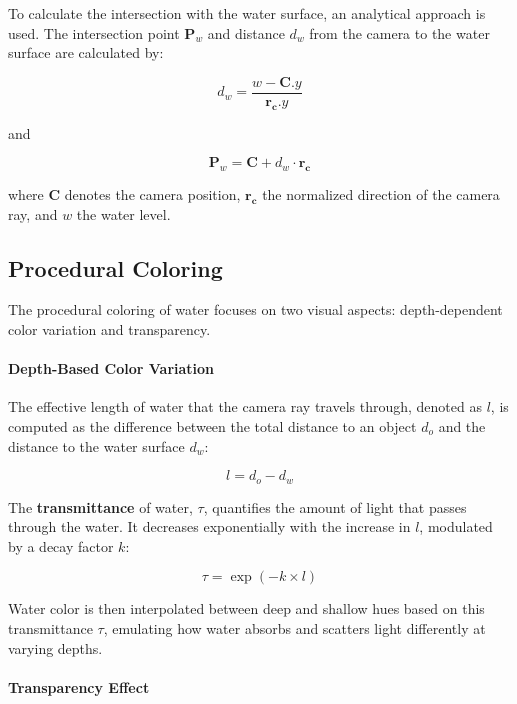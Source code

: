 To calculate the intersection with the water surface, an analytical approach is used. The intersection point $\mathbf{P}_w$ and distance $d_w$ from the camera to the water surface are calculated by:

\begin{equation}
d_{w} = \frac{w - \mathbf{C}.y}{\mathbf{r_c}.y}
\end{equation}

and

\begin{equation}
\mathbf{P}_{w} = \mathbf{C} + d_{w}\cdot\mathbf{r_c}
\end{equation}

where $\mathbf{C}$ denotes the camera position, $\mathbf{r_c}$ the normalized direction of the camera ray, and $w$ the water level.

\subsection{Procedural Coloring}

The procedural coloring of water focuses on two visual aspects: depth-dependent color variation and transparency. 

\paragraph{Depth-Based Color Variation}
   
The effective length of water that the camera ray travels through, denoted as $l$, is computed as the difference between the total distance to an object $d_{o}$ and the distance to the water surface $d_{w}$:

\begin{equation}
   l = d_{o}-d_w
\end{equation}

The \textbf{transmittance} of water, $\tau$, quantifies the amount of light that passes through the water. It decreases exponentially with the increase in $l$, modulated by a decay factor $k$:

\begin{equation}
    \tau = \exp(-k \times l)
\end{equation}
   
Water color is then interpolated between deep and shallow hues based on this transmittance $\tau$, emulating how water absorbs and scatters light differently at varying depths.

\paragraph{Transparency Effect}

